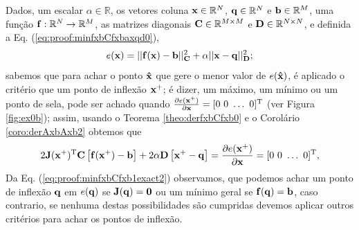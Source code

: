 \begin{myproofT}\label{proof:theo:minfxbCfxbaxqd}
Dados,
um escalar $\alpha\in \mathbb{R}$,
os vetores coluna $\VECTOR{x}\in \mathbb{R}^N$, 
$\VECTOR{q}\in \mathbb{R}^N$ e
$\VECTOR{b}\in \mathbb{R}^M$,  
uma função $\VECTOR{f}:\mathbb{R}^{N} \rightarrow \mathbb{R}^{M}$, 
as matrizes diagonais $\MATRIX{C} \in \mathbb{R}^{M\times M}$ e $\MATRIX{D} \in \mathbb{R}^{N\times N}$, e 
definida a Eq. (\ref{eq:proof:minfxbCfxbaxqd0}),
\begin{equation}\label{eq:proof:minfxbCfxbaxqd0}
e(\VECTOR{x})=||\VECTOR{f}(\VECTOR{x})-\VECTOR{b}||_{\MATRIX{C}}^2+\alpha||\VECTOR{x}-\VECTOR{q}||_{\MATRIX{D}}^2;
\end{equation}
sabemos que para achar o ponto $\VECTOR{\hat{x}}$ que gere o menor valor de $e(\VECTOR{\hat{x}})$, é aplicado
o critério que um ponto de inflexão $\VECTOR{x}^+$; é dizer, um máximo, um mínimo ou um ponto de sela, pode ser achado quando 
$\frac{\partial e(\VECTOR{x}^+)}{\partial \VECTOR{x} }=[0~ 0~ \hdots~ 0 ]^{\transpose}$ (ver Figura \ref{fig:ex0b});
assim, usando o Teorema \ref{theo:derfxbCfxb0} e o Corolário \ref{coro:derAxbAxb2} obtemos que
\begin{equation}\label{eq:proof:minfxbCfxb1exact2}
2 \MATRIX{J}(\VECTOR{x}^+)^{\transpose}\MATRIX{C}\left[ \VECTOR{f}(\VECTOR{x}^+)-\VECTOR{b} \right] +
2 \alpha\MATRIX{D}\left[\VECTOR{x}^+-\VECTOR{q}\right]
=
\frac{\partial e(\VECTOR{x}^+)}{\partial \VECTOR{x} }=[0~ 0~ \hdots~ 0 ]^{\transpose},
\end{equation}
Da Eq. (\ref{eq:proof:minfxbCfxb1exact2}) observamos, 
que podemos achar um ponto de inflexão $\VECTOR{q}$
em $e(\VECTOR{q})$ se 
$\MATRIX{J}(\VECTOR{q})  = \MATRIX{0}$ ou um mínimo geral se $\VECTOR{f}(\VECTOR{q})=\VECTOR{b}$,
caso contrario, 
se nenhuma destas possibilidades são cumpridas devemos aplicar outros critérios para achar os pontos de inflexão.


\end{myproofT}
